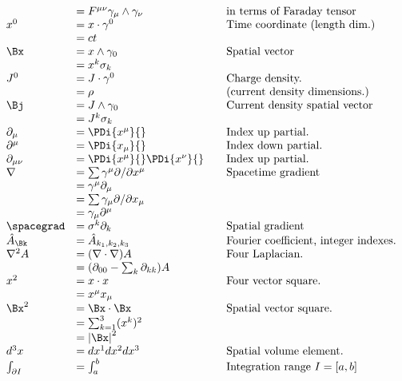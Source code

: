 \begin{equation*}
\begin{array}{l l l}
  &= F^{\mu\nu} \gamma_\mu \wedge \gamma_\nu & \quad \mbox{in terms of Faraday tensor} \\
x^{0} &= x \cdot \gamma^0 & \quad \mbox{Time coordinate (length dim.)} \\
      &= c t \\
\Bx &= x \wedge \gamma_0 & \quad \mbox{Spatial vector} \\
    &= x^k \sigma_k \\
J^{0} &= J \cdot \gamma^0 & \quad \mbox{Charge density.} \\
      &= \rho & \quad \mbox{(current density dimensions.)} \\
\Bj &= J \wedge \gamma_0 & \quad \mbox{Current density spatial vector} \\
    &= J^k \sigma_k \\
\partial_{\mu} &= \PDi{x^\mu}{} & \quad \mbox{Index up partial.} \\
\partial^{\mu} &= \PDi{x_\mu}{} & \quad \mbox{Index down partial.} \\
\partial_{\mu\nu} &= \PDi{x^\mu}{}\PDi{x^\nu}{} & \quad \mbox{Index up partial.} \\
\grad &= \sum \gamma^{\mu} \partial/\partial {x^{\mu}} & \quad \mbox{Spacetime gradient} \\
      &= \gamma^{\mu}\partial_{\mu} \\
      &= \sum \gamma_{\mu} \partial/\partial {x_{\mu}} \\
      &= \gamma_{\mu}\partial^{\mu} \\
\spacegrad &= \sigma^{k} \partial_k & \quad \mbox{Spatial gradient} \\
\hat{A}_{\Bk} &= \hat{A}_{k_1,k_2,k_3} & \quad \mbox{Fourier coefficient, integer indexes.} \\
\grad^2 A
   &= (\grad \cdot \grad) A & \quad \mbox{Four Laplacian. } \\
   &= (\partial_{00} - \sum_k \partial_{kk}) A & \\
x^2 &= x \cdot x & \quad \mbox{Four vector square. } \\
    &= x^\mu x_\mu \\
\Bx^2 &= \Bx \cdot \Bx & \quad \mbox{Spatial vector square. } \\
    &= \sum_{k=1}^3 (x^k)^2 \\
    &= \Abs{\Bx}^2 \\
d^3 x &= dx^1 dx^2 dx^3 & \quad \mbox{Spatial volume element. } \\
\int_{\partial I} &= \int_{a}^{b} & \quad \mbox{Integration range $I = [a,b]$ } \\

\end{array}
\end{equation*}
